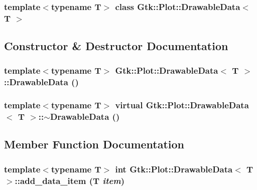 \subsubsection*{template$<$typename T$>$ class Gtk::Plot::DrawableData$<$ T $>$}



\subsection{Constructor \& Destructor Documentation}
\hypertarget{classGtk_1_1Plot_1_1DrawableData_a667213ec180f9292dfc6e57ddd63cd2b}{
\subsubsection[{DrawableData}]{\setlength{\rightskip}{0pt plus 5cm}template$<$typename T$>$ {\bf Gtk::Plot::DrawableData}$<$ T $>$::{\bf DrawableData} ()}}
\label{classGtk_1_1Plot_1_1DrawableData_a667213ec180f9292dfc6e57ddd63cd2b}
\hypertarget{classGtk_1_1Plot_1_1DrawableData_a56e3932c40f009ba2bea91c92a0f997a}{
\subsubsection[{$\sim$DrawableData}]{\setlength{\rightskip}{0pt plus 5cm}template$<$typename T$>$ virtual {\bf Gtk::Plot::DrawableData}$<$ T $>$::$\sim${\bf DrawableData} ()}}
\label{classGtk_1_1Plot_1_1DrawableData_a56e3932c40f009ba2bea91c92a0f997a}


\subsection{Member Function Documentation}
\hypertarget{classGtk_1_1Plot_1_1DrawableData_a7565034d7fa2fc8b9f230a3c792cecaa}{
\subsubsection[{add\_\-data\_\-item}]{\setlength{\rightskip}{0pt plus 5cm}template$<$typename T$>$ int {\bf Gtk::Plot::DrawableData}$<$ T $>$::add\_\-data\_\-item (T {\em item})}}
\label{classGtk_1_1Plot_1_1DrawableData_a7565034d7fa2fc8b9f230a3c792cecaa}



